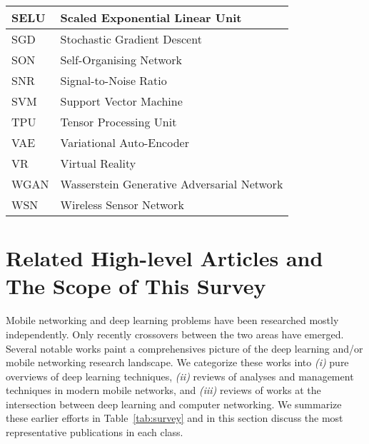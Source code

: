 \documentclass[journal,comsoc,letter]{IEEEtran}
\begin{document}
\begin{table}[htpb!]
\begin{tabular}{|C{2.1cm}||C{5.7cm}|}
SELU & Scaled Exponential Linear Unit \\ \hline
SGD & Stochastic Gradient Descent \\ \hline
SON & Self-Organising Network \\ \hline
SNR & Signal-to-Noise Ratio \\ \hline
SVM & Support Vector Machine \\ \hline
TPU & Tensor Processing Unit \\ \hline
VAE & Variational Auto-Encoder \\ \hline
VR & Virtual Reality \\ \hline
WGAN & Wasserstein Generative Adversarial Network\\ \hline
WSN & Wireless Sensor Network \\\hline
\end{tabular}
\end{table}

\section{Related High-level Articles and \\The Scope of This Survey}\label{sec:related}
Mobile networking and deep learning problems have been researched mostly independently. Only recently crossovers between the two areas have emerged. Several notable works paint a comprehensives picture of the deep learning and/or mobile networking research landscape. We categorize these works into \emph{(i)} pure overviews of deep learning techniques, \emph{(ii)} reviews of analyses and management techniques in modern mobile networks, and \emph{(iii)} reviews of works at the intersection between deep learning and computer networking. We summarize these earlier efforts in Table~\ref{tab:survey} and in this section discuss the most representative publications in each class. 
\end{document}
